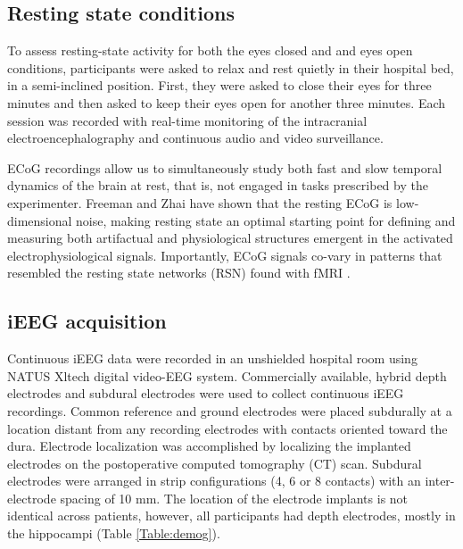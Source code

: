 \documentclass[11pt, onecolumn]{article}
\begin{document}
\subsection{Resting state conditions}
To assess resting-state activity for both the eyes closed and and eyes open conditions, participants were asked to relax and rest quietly in their hospital bed, in a semi-inclined position. First, they were asked to close their eyes for three minutes and then asked to keep their eyes open for another three minutes. Each session was recorded with real-time monitoring of the intracranial electroencephalography and continuous audio and video surveillance.

ECoG recordings allow us to simultaneously study both fast and slow temporal dynamics of the brain at rest, that is, not engaged in tasks prescribed by the experimenter.
Freeman and Zhai \citep{freeman2009simulated} have shown that the resting ECoG is low-dimensional noise, making resting state an optimal starting point for defining and measuring both artifactual and physiological structures emergent in the activated electrophysiological signals. Importantly, ECoG signals co-vary in patterns that resembled the resting state networks (RSN) found with fMRI  \citep{fukushima2015studying}.

\subsection{iEEG acquisition}
Continuous iEEG data were recorded in an unshielded hospital room using NATUS Xltech digital video-EEG system.
Commercially available, hybrid depth electrodes and subdural electrodes were used to collect continuous iEEG recordings. Common reference and ground electrodes were placed subdurally at a location distant from any recording electrodes with contacts oriented toward the dura.
Electrode localization was accomplished by localizing the implanted electrodes on the postoperative computed tomography (CT) scan.
Subdural electrodes were arranged in strip configurations (4, 6 or 8 contacts) with an inter-electrode spacing of 10 mm. The location of the electrode implants is not identical across patients, however, all participants had depth  electrodes,  mostly  in the hippocampi   (Table \ref{Table:demog}).
\end{document}
